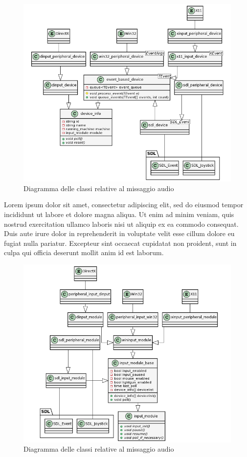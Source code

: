 \begin{figure}[H]
	\includegraphics[width=\linewidth]{immagini/class_input_device}
	\caption{Diagramma delle classi relative al missaggio audio}
	\label{fig:class_input_device}
\end{figure}

Lorem ipsum dolor sit amet, consectetur adipiscing elit, sed do eiusmod tempor incididunt ut labore et dolore magna aliqua. Ut enim ad minim veniam, quis nostrud exercitation ullamco laboris nisi ut aliquip ex ea commodo consequat. Duis aute irure dolor in reprehenderit in voluptate velit esse cillum dolore eu fugiat nulla pariatur. Excepteur sint occaecat cupidatat non proident, sunt in culpa qui officia deserunt mollit anim id est laborum.

\begin{figure}[H]
	\includegraphics[width=\linewidth]{immagini/class_input_module}
	\caption{Diagramma delle classi relative al missaggio audio}
	\label{fig:class_input_module}
\end{figure}


